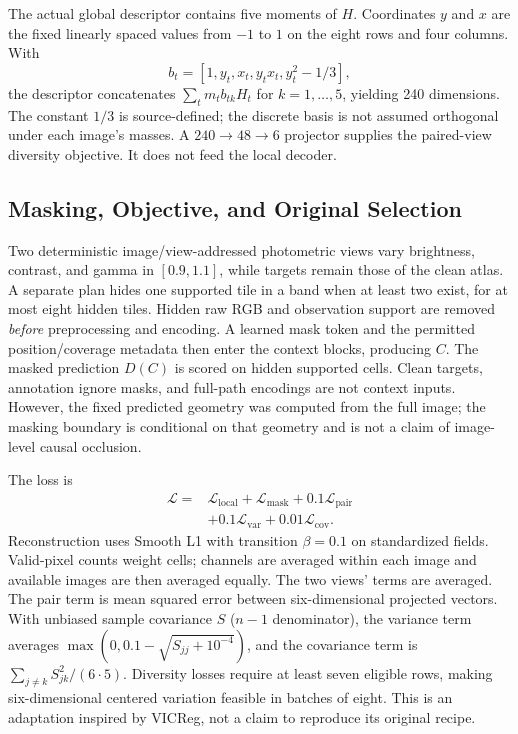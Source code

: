 The actual global descriptor contains five moments of $H$. Coordinates $y$ and $x$ are the fixed linearly spaced values from $-1$ to $1$ on the eight rows and four columns. With
\begin{equation}
 b_t=[1,y_t,x_t,y_tx_t,y_t^2-1/3],
\end{equation}
the descriptor concatenates $\sum_t m_t b_{tk}H_t$ for $k=1,\ldots,5$, yielding 240 dimensions. The constant $1/3$ is source-defined; the discrete basis is not assumed orthogonal under each image's masses. A $240\rightarrow48\rightarrow6$ projector supplies the paired-view diversity objective. It does not feed the local decoder.

\subsection{Masking, Objective, and Original Selection}\label{sec:training}
Two deterministic image/view-addressed photometric views vary brightness, contrast, and gamma in $[0.9,1.1]$, while targets remain those of the clean atlas. A separate plan hides one supported tile in a band when at least two exist, for at most eight hidden tiles. Hidden raw RGB and observation support are removed \emph{before} preprocessing and encoding. A learned mask token and the permitted position/coverage metadata then enter the context blocks, producing $C$. The masked prediction $D(C)$ is scored on hidden supported cells. Clean targets, annotation ignore masks, and full-path encodings are not context inputs. However, the fixed predicted geometry was computed from the full image; the masking boundary is conditional on that geometry and is not a claim of image-level causal occlusion.

The loss is
\begin{equation}\label{eq:loss}
\begin{split}
\mathcal{L}={}&\mathcal{L}_{\mathrm{local}}+\mathcal{L}_{\mathrm{mask}}
 +0.1\mathcal{L}_{\mathrm{pair}}\\
 &+0.1\mathcal{L}_{\mathrm{var}}+0.01\mathcal{L}_{\mathrm{cov}}.
\end{split}
\end{equation}
Reconstruction uses Smooth L1 with transition $\beta=0.1$ on standardized fields. Valid-pixel counts weight cells; channels are averaged within each image and available images are then averaged equally. The two views' terms are averaged. The pair term is mean squared error between six-dimensional projected vectors. With unbiased sample covariance $S$ ($n-1$ denominator), the variance term averages $\max(0,0.1-\sqrt{S_{jj}+10^{-4}})$, and the covariance term is $\sum_{j\ne k}S_{jk}^2/(6\cdot5)$. Diversity losses require at least seven eligible rows, making six-dimensional centered variation feasible in batches of eight. This is an adaptation inspired by VICReg, not a claim to reproduce its original recipe.

